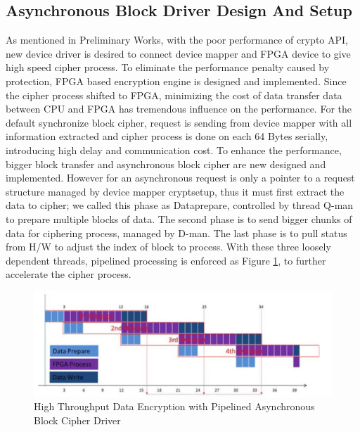 \documentclass[10pt]{report}
\begin{document}
			\subsection{Asynchronous Block Driver Design And Setup}
			As mentioned in Preliminary Works, with the poor performance of crypto API, new device driver is desired to connect device mapper and FPGA device to give high speed cipher process. To eliminate the performance penalty caused by protection, FPGA based encryption engine is designed and implemented. Since the cipher process shifted to FPGA, minimizing the cost of data transfer data between CPU and FPGA has tremendous influence on the performance. For the default synchronize block cipher, request is sending from device mapper with all information extracted and cipher process is done on each 64 Bytes serially, introducing high delay and communication cost. To enhance the performance, bigger block transfer and asynchronous block cipher are new designed and implemented.
			However for an asynchronous request is only a pointer to a request structure managed by device mapper cryptsetup, thus it must first extract the data to cipher; we called this phase as Dataprepare, controlled by thread Q-man to prepare multiple blocks of data. The second phase is to send bigger chunks of data for ciphering process, managed by D-man. The last phase is to pull status from H/W to adjust the index of block to process. With these three loosely dependent threads, pipelined processing is enforced as Figure \ref{Figure 3}, to further accelerate the cipher process.
				\begin{figure}[ft]
				\includegraphics[width=\textwidth,height=\textheight,keepaspectratio] {fig3}
				\caption{High Throughput Data Encryption with Pipelined Asynchronous Block Cipher Driver}
				\label{Figure 3}
				\end{figure}
\end{document}
